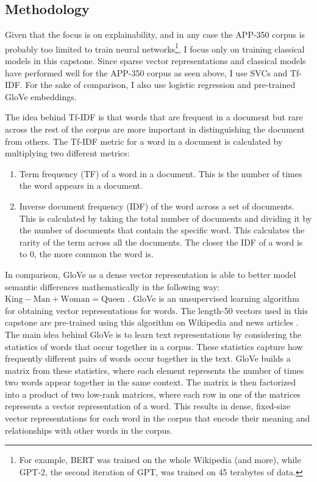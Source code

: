 \subsection{Methodology}
Given that the focus is on explainability, and in any case the APP-350 corpus is probably too limited to train neural networks\footnote{For example, BERT was trained on the whole Wikipedia (and more), while GPT-2, the second iteration of GPT, was trained on 45 terabytes of data.}, I focus only on training classical models in this capstone. Since sparse vector representations and classical models have performed well for the APP-350 corpus as seen above, I use SVCs and Tf-IDF. For the sake of comparison, I also use logistic regression and pre-trained GloVe embeddings.

The idea behind Tf-IDF is that words that are frequent in a document but rare across the rest of the corpus are more important in distinguishing the document from others. The Tf-IDF metric for a word in a document is calculated by multiplying two different metrics:

\begin{enumerate}
	\item Term frequency (TF) of a word in a document. This is the number of times the word appears in a document.
	\item Inverse document frequency (IDF) of the word across a set of documents. This is calculated by taking the total number of documents and dividing it by the number of documents that contain the specific word. This calculates the rarity of the term across all the documents. The closer the IDF of a word is to 0, the more common the word is.
\end{enumerate}

In comparison, GloVe as a dense vector representation is able to better model semantic differences mathematically in the following way: $\text{King} - \text{Man} + \text{Woman} = \text{Queen}$ \cite{vector_differences_2015}. GloVe is an unsupervised learning algorithm for obtaining vector representations for words. The length-50 vectors used in this capstone are pre-trained using this algorithm on Wikipedia and news articles \cite{pennington2014glove}. The main idea behind GloVe is to learn text representations by considering the statistics of words that occur together in a corpus. These statistics capture how frequently different pairs of words occur together in the text. GloVe builds a matrix from these statistics, where each element represents the number of times two words appear together in the same context. The matrix is then factorized into a product of two low-rank matrices, where each row in one of the matrices represents a vector representation of a word. This results in dense, fixed-size vector representations for each word in the corpus that encode their meaning and relationships with other words in the corpus.


